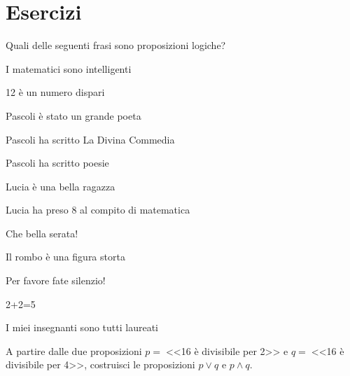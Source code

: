 \section{Esercizi}

\begin{esercizio}
\label{ese:0.1}
Quali delle seguenti frasi sono proposizioni logiche?
\begin{enumeratea}
\item I matematici sono intelligenti				\tab\qquad\boxV\qquad\boxF
\item 12 è un numero dispari						\tab\qquad\boxV\qquad\boxF
\item Pascoli è stato un grande poeta			\tab\qquad\boxV\qquad\boxF
\item Pascoli ha scritto La Divina Commedia		\tab\qquad\boxV\qquad\boxF
\item Pascoli ha scritto poesie					\tab\qquad\boxV\qquad\boxF
\item Lucia è una bella ragazza					\tab\qquad\boxV\qquad\boxF
\item Lucia ha preso 8 al compito di matematica	\tab\qquad\boxV\qquad\boxF
\item Che bella serata!							\tab\qquad\boxV\qquad\boxF
\item Il rombo è una figura storta				\tab\qquad\boxV\qquad\boxF
\item Per favore fate silenzio!					\tab\qquad\boxV\qquad\boxF
\item 2+2=5										\tab\qquad\boxV\qquad\boxF
\item I miei insegnanti sono tutti laureati		\tab\qquad\boxV\qquad\boxF
\end{enumeratea}
\end{esercizio}

\begin{esercizio}
\label{ese:0.2}
A partire dalle due proposizioni $p =\;$<<16 è divisibile per 2>> e $q =\;$<<16 è divisibile per 4>>,
costruisci le proposizioni $p\vee q$ e $p\wedge q$.
\end{esercizio}

